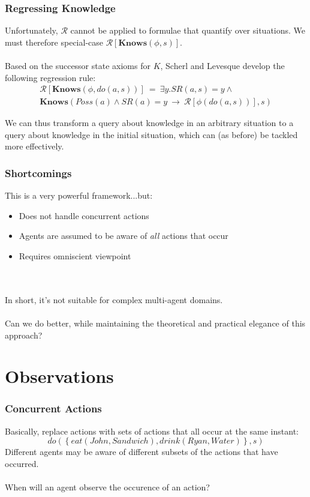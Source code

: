 \documentclass{beamer}
\begin{document}
\begin{frame}
\frametitle{Regressing Knowledge}
Unfortunately, $\mathcal{R}$ cannot be applied to formulae that quantify
over situations.  We must therefore special-case
$\mathcal{R}[\mathbf{Knows}(\phi,s)]$.
\ \\
\ \\
Based on the successor state axioms for $K$, Scherl and Levesque develop
the following regression rule:
\begin{multline*}
  \mathcal{R}[\mathbf{Knows}(\phi,do(a,s))]\ =\ 
    \exists y . SR(a,s) = y \wedge \\
    \mathbf{Knows}(Poss(a) \wedge SR(a)=y\ \rightarrow\ \mathcal{R}[\phi(do(a,s))],s)
\end{multline*}

We can thus transform a query about knowledge in an arbitrary situation to
a query about knowledge in the initial situation, which can (as before) be
tackled more effectively.

\end{frame}

\begin{frame}
\frametitle{Shortcomings}
This is a very powerful framework...but:
\begin{itemize}
 \item Does not handle concurrent actions
 \item Agents are assumed to be aware of \emph{all} actions that occur
 \item Requires omniscient viewpoint
\end{itemize}
\ \\
\ \\
\pause
In short, it's not suitable for complex multi-agent domains.
\ \\
\ \\
Can we do better, while maintaining the theoretical and practical elegance
of this approach?
\end{frame}

\section{Observations}

\begin{frame}
\frametitle{Concurrent Actions}
Basically, replace actions with sets of actions that all occur at the same
instant:
\begin{equation*}
  do(\left\{eat(John,Sandwich),drink(Ryan,Water)\right\},s)
\end{equation*}
\pause
Different agents may be aware of different subsets of the actions that
have occurred.
\ \\
\ \\
When will an agent observe the occurence of an action?
\end{frame}
\end{document}
